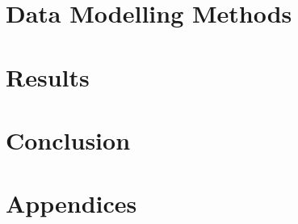 \documentclass[a4paper,12pt,twoside]{report}
\begin{document}
\begin{onehalfspace}
\chapter{Data Modelling Methods}
\label{c:methods}



\clearpage
\chapter{Results}
\label{c:results}



\clearpage
\chapter{Conclusion}
\label{c:conclusion}


\clearpage
	\setcounter{chapter}{1}
	\fancyhf{}
	\rhead{\thepage}
\renewcommand{\thechapter}{\Alph{chapter}}
\chapter*{Appendices}
\label{chap_appendices}




\clearpage
	\fancyhf{}
	\rhead{\thepage}
	\lhead{\textbf{ \nouppercase{\leftmark}} }
{}
%
%
\printbibliography

\end{onehalfspace}
\end{document}
